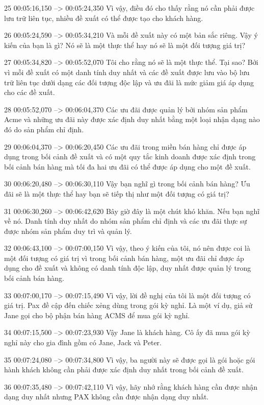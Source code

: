 25
00:05:16,150 --> 00:05:24,350
Vì vậy, điều đó cho thấy rằng nó cần phải được lưu trữ liên tục, nhiều đề xuất có thể được tạo cho khách hàng.

26
00:05:24,590 --> 00:05:34,210
Và mỗi đề xuất này có một bản sắc riêng.  Vậy ý kiến ​​của bạn là gì?  Nó sẽ là một thực thể hay nó sẽ là một đối tượng giá trị?

27
00:05:34,820 --> 00:05:52,070
Tôi cho rằng nó sẽ là một thực thể.  Tại sao?  Bởi vì mỗi đề xuất có một danh tính duy nhất và các đề xuất được lưu vào bộ lưu trữ liên tục dưới dạng các đối tượng độc lập và ưu đãi là mức giảm giá áp dụng cho các đề xuất.

28
00:05:52,070 --> 00:06:04,370
Các ưu đãi được quản lý bởi nhóm sản phẩm Acme và những ưu đãi này được xác định duy nhất bằng một loại nhận dạng nào đó do sản phẩm chỉ định.

29
00:06:04,370 --> 00:06:20,450
Các ưu đãi trong miền bán hàng chỉ được áp dụng trong bối cảnh đề xuất và có một quy tắc kinh doanh được xác định trong bối cảnh bán hàng mà tối đa hai ưu đãi có thể được áp dụng cho một đề xuất.

30
00:06:20,480 --> 00:06:30,110
Vậy bạn nghĩ gì trong bối cảnh bán hàng?  Ưu đãi sẽ là một thực thể hay bạn sẽ tiếp thị như một đối tượng có giá trị?

31
00:06:30,260 --> 00:06:42,620
Bây giờ đây là một chút khó khăn.  Nếu bạn nghĩ về nó.  Danh tính duy nhất do nhóm sản phẩm chỉ định và các ưu đãi thực sự được nhóm sản phẩm duy trì và quản lý.

32
00:06:43,100 --> 00:07:00,150
Vì vậy, theo ý kiến ​​​​của tôi, nó nên được coi là một đối tượng có giá trị vì trong bối cảnh bán hàng, một ưu đãi chỉ được áp dụng cho đề xuất và không có danh tính độc lập, duy nhất được quản lý trong bối cảnh bán hàng.

33
00:07:00,170 --> 00:07:15,490
Vì vậy, lời đề nghị của tôi là một đối tượng có giá trị.  Pax đề cập đến chiếc xẻng dùng trong gói kỳ nghỉ.  Là một ví dụ, giả sử Jane gọi cho bộ phận bán hàng ACMS để mua gói kỳ nghỉ.

34
00:07:15,500 --> 00:07:23,930
Vậy Jane là khách hàng.  Cô ấy đã mua gói kỳ nghỉ này cho gia đình gồm có Jane, Jack và Peter.

35
00:07:24,080 --> 00:07:34,800
Vì vậy, ba người này sẽ được gọi là gói hoặc gói hành khách không cần phải được xác định duy nhất trong bối cảnh đề xuất.

36
00:07:35,480 --> 00:07:42,110
Vì vậy, hãy nhớ rằng khách hàng cần được nhận dạng duy nhất nhưng PAX không cần được nhận dạng duy nhất.

